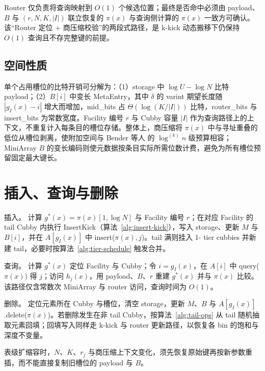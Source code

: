 Router 仅负责将查询映射到 \(O(1)\) 个候选位置；最终是否命中必须由 payload、\(B\) 与 \((r,N,K,|I|)\) 联立恢复的 \(\pi(x)\) 与查询侧计算的 \(\pi(x)\) 一致方可确认。该“Router 定位 + 商压缩校验”的两段式路径，是 k-kick 动态搬移下仍保持 \(O(1)\) 查询且不存完整键的前提\cite{bender2022otsh,pagh2008retrieval}。


\subsection{空间性质}

单个占用槽位的比特开销可分解为：（1）storage 中 \(\log U-\log N\) 比特 payload；（2）\(B[i]\) 中变长 MetaEntry，其中 \(\delta\) 的 varint 期望长度随 \(|g_I(x)-i|\) 增大而增加，mid\_bits 占 \(\Theta(\log(K/|I|))\) 比特，router\_bits 与 insert\_bits 为常数宽度。Facility 编号 \(r\) 与 Cubby 容量 \(|I|\) 作为查询路径上的上下文，不重复计入每条目的槽位存储。整体上，商压缩将 \(\pi(x)\) 中与寻址重叠的低位从槽位剥离，使附加空间与 Bender 等人\cite{bender2022otsh} 的 \(\log^{(k)}n\) 级预算相容；MiniArray \(B\) 的变长编码则使元数据按条目实际所需位数计费，避免为所有槽位预留固定最大键长\cite{kurpicz2023pachash,lehmann2024shockhash}。

\section{插入、查询与删除}

插入。 计算 \(g^\ast(x)=\pi(x)[1,\log N]\) 与 Facility 编号 \(r\)；在对应 Facility 的 tail Cubby 内执行 InsertKick（算法~\ref{alg:insert-kick}），写入 storage、更新 \(M\) 与 \(B[i]\)，并在 \(A[g_I(x)]\) 中 insert(\(\pi(x),j\))。tail 满则挂入 1- tier cubbies 并新建 tail，必要时按算法~\ref{alg:tier-schedule} 触发合并\cite{bender2022otsh,mitzenmacher2001}。

查询。 计算 \(g^\ast(x)\) 定位 Facility 与 Cubby；令 \(i=g_I(x)\)，在 \(A[i]\) 中 query(\(\pi(x)\)) 得 \(j\)；访问 \(h_j(x)\)，用 payload、\(B\)、\(r\) 重建 \(g^\ast(x)\) 并与 \(\pi(x)\) 比较。该路径仅含常数次 MiniArray 与 router 访问，查询时间为 \(O(1)\)\cite{bender2022otsh}。

删除。 定位元素所在 Cubby 与槽位，清空 storage，更新 \(M\)、\(B\) 与 \(A[g_I(x)]\).delete(\(\pi(x)\))。若删除发生在非 tail Cubby，按算法~\ref{alg:tail-ops} 从 tail 随机抽取元素回填；回填写入同样走 k-kick 与 router 更新路径，以恢复各 bin 的饱和与深度不变量。

表级扩缩容时，\(N\)、\(K\)、\(r_j\) 与商压缩上下文变化，须先恢复原始键再按新参数重插，而不能直接复制旧槽位的 payload 与 \(B\)\cite{bender2022otsh,bender2024sosa}。

